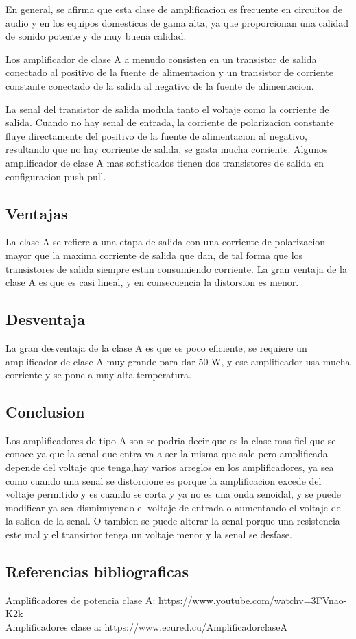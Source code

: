 \documentclass[12pt,a4paper]{article}
\begin{document}
En general, se afirma que esta clase de amplificacion es frecuente en circuitos de audio y en los equipos domesticos de gama alta, ya que proporcionan una calidad de sonido potente y de muy buena calidad.

Los amplificador de clase A a menudo consisten en un transistor de salida conectado al positivo de la fuente de alimentacion y un transistor de corriente constante conectado de la salida al negativo de la fuente de alimentacion.

La senal del transistor de salida modula tanto el voltaje como la corriente de salida. Cuando no hay senal de entrada, la corriente de polarizacion constante fluye directamente del positivo de la fuente de alimentacion al negativo, resultando que no hay corriente de salida, se gasta mucha corriente. Algunos amplificador de clase A mas sofisticados tienen dos transistores de salida en configuracion push-pull.

\subsection{Ventajas}
La clase A se refiere a una etapa de salida con una corriente de polarizacion mayor que la maxima corriente de salida que dan, de tal forma que los transistores de salida siempre estan consumiendo corriente. La gran ventaja de la clase A es que es casi lineal, y en consecuencia la distorsion es menor.

\subsection{Desventaja}
La gran desventaja de la clase A es que es poco eficiente, se requiere un amplificador de clase A muy grande para dar 50 W, y ese amplificador usa mucha corriente y se pone a muy alta temperatura.

\subsection{Conclusion}
Los amplificadores de tipo A son se podria decir que es la clase mas fiel que se conoce ya que la senal que entra va a ser la misma que sale pero amplificada depende del voltaje que tenga,hay varios arreglos en los amplificadores, ya sea como cuando una senal se distorcione es porque la amplificacion excede del voltaje permitido y es cuando se corta y ya no es una onda senoidal, y se puede modificar ya sea disminuyendo el voltaje de entrada o aumentando el voltaje de la salida de la senal.
O tambien se puede alterar la senal porque una resistencia este mal y el transirtor tenga un voltaje menor y la senal se desfase.

\subsection{Referencias bibliograficas}
Amplificadores de potencia clase A: https://www.youtube.com/watchv=3FVnao-K2k\\
Amplificadores clase a: https://www.ecured.cu/AmplificadorclaseA
\end{document}

